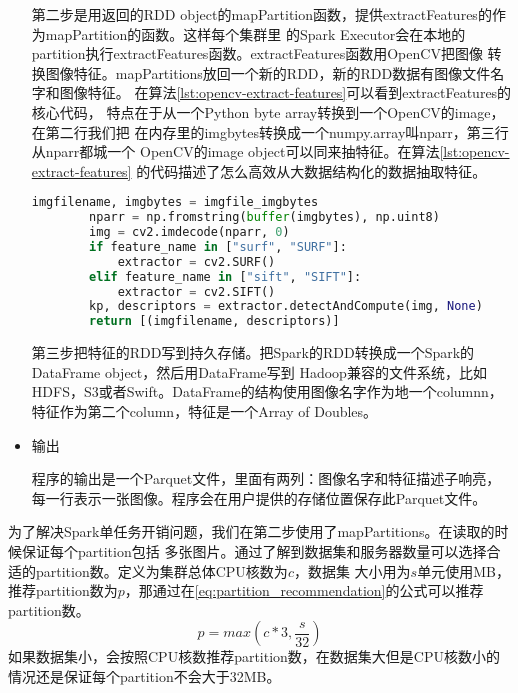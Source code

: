 \begin{itemize}
        第二步是用返回的RDD object的mapPartition函数，提供extractFeatures的作为mapPartition的函数。这样每个集群里
        的Spark Executor会在本地的partition执行extractFeatures函数。extractFeatures函数用OpenCV把图像
        转换图像特征。mapPartitions放回一个新的RDD，新的RDD数据有图像文件名字和图像特征。
        在算法\ref{lst:opencv-extract-features}可以看到extractFeatures的核心代码，
        特点在于从一个Python byte array转换到一个OpenCV的image，在第二行我们把
        在内存里的imgbytes转换成一个numpy.array叫nparr，第三行从nparr都城一个
        OpenCV的image object可以同来抽特征。在算法\ref{lst:opencv-extract-features}
        的代码描述了怎么高效从大数据结构化的数据抽取特征。
        \begin{minipage}{\linewidth}
        \begin{lstlisting}[language=Python,
                           basicstyle=\small,
                           showstringspaces=false,
                           caption={OpenCV从内存读取图像抽取特征},
                           label={lst:opencv-extract-features}]
        imgfilename, imgbytes = imgfile_imgbytes
        nparr = np.fromstring(buffer(imgbytes), np.uint8)
        img = cv2.imdecode(nparr, 0)
        if feature_name in ["surf", "SURF"]:
            extractor = cv2.SURF()
        elif feature_name in ["sift", "SIFT"]:
            extractor = cv2.SIFT()
        kp, descriptors = extractor.detectAndCompute(img, None)
        return [(imgfilename, descriptors)]
        \end{lstlisting}
        \end{minipage}

        第三步把特征的RDD写到持久存储。把Spark的RDD转换成一个Spark的DataFrame object，然后用DataFrame写到
        Hadoop兼容的文件系统，比如HDFS，S3或者Swift。DataFrame的结构使用图像名字作为地一个columnn，
        特征作为第二个column，特征是一个Array of Doubles。


  \item 输出

        程序的输出是一个Parquet文件，里面有两列：图像名字和特征描述子响亮，
        每一行表示一张图像。程序会在用户提供的存储位置保存此Parquet文件。

\end{itemize}

为了解决Spark单任务开销问题，我们在第二步使用了mapPartitions。在读取的时候保证每个partition包括
多张图片。通过了解到数据集和服务器数量可以选择合适的partition数。定义为集群总体CPU核数为$c$，数据集
大小用为$s$单元使用MB，推荐partition数为$p$，那通过在\ref{eq:partition_recommendation}的公式可以推荐partition数。
\begin{equation} \label{eq:partition_recommendation}
p = max(c * 3, \frac{s}{32})
\end{equation}
如果数据集小，会按照CPU核数推荐partition数，在数据集大但是CPU核数小的情况还是保证每个partition不会大于32MB。




